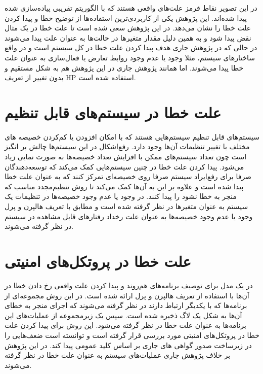 در این تصویر نقاط قرمز علت‌های واقعی هستند که با الگوریتم تقریبی پیاده‌سازی شده پیدا شده‌اند.
 این پژوهش یکی از کاربردی‌ترین استفاده‌ها از توضیح خطا و پیدا کردن علت خطا را نشان می‌دهد. 
در این پژوهش سعی شده است تا علت خطا در یک مثال نقض پیدا شود و به همین دلیل مقدار متغیر‌ها در حالت‌ها به عنوان علت پیدا می‌شوند در حالی که در پژوهش جاری هدف پیدا کردن علت خطا در کل سیستم است و در واقع ساختار‌های سیستم، مثلا وجود یا عدم وجود روابط تعارض یا فعال‌سازی به عنوان علت خطا پیدا می‌شوند.
اما همانند پژوهش جاری در این پژوهش هم به شکل مستقیم و بدون تغییر از تعریف 
HP
استفاده شده است.

\section{علت خطا در سیستم‌های قابل تنظیم}
سیستم‌های قابل تنظیم
سیستم‌هایی هستند که با امکان افزودن یا کم‌کردن خصیصه‌
های مختلف با تغییر تنظیمات
آن‌ها وجود دارد.
رفع‌اشکال در این سیستم‌ها چالش بر انگیز است چون تعداد سیستم‌های ممکن با افزایش تعداد خصیصه‌ها به صورت نمایی زیاد می‌شود.
پیدا کردن علت خطا در چنین سیستم‌هایی کمک می‌کند که توسعه‌دهندگان صرفا برای رفع‌ایراد سیستم صرفا روی خصیصه‌ای تمرکز کنند که به عنوان علت خطا پیدا شده است و علاوه بر این به آن‌ها کمک می‌کند تا روش تنظیم‌مجدد
مناسب که منجر به خطا نشود را پیدا کنند.
در 
\cite{assmann2021tactile}
وجود یا عدم وجود خصیصه‌ها در تنظیمات یک سیستم به عنوان متغیر‌ها در نظر گرفته شده‌ است و مطابق با تعریف هالپرن و پرل وجود یا عدم وجود خصیصه‌ها به عنوان علت رخداد رفتار‌های قابل مشاهده در سیستم در نظر گرفته می‌شوند.

\section{علت خطا در پروتکل‌های امنیتی}
در
\cite{actions-cause}
یک مدل برای توصیف برنامه‌های هم‌روند و پیدا کردن علت واقعی رخ دادن خطا در آن‌ها با استفاده از تعریف هالپرن و پرل ارائه شده است.
در این روش مجموعه‌ای از برنامه‌ها که با یکدیگر ارتباط دارند در نظر گرفته می‌شوند که اجرای منجر به خطای آن‌ها به شکل یک لاگ
ذخیره شده است.
سپس یک زیرمجموعه از عملیات‌های این برنامه‌ها به عنوان علت خطا در نظر گرفته می‌شود.
این روش برای پیدا کردن علت خطا در پروتکل‌های امنیتی مورد بررسی قرار گرفته است و توانسته است ضعف‌هایی را در زیرساخت صدور گواهی
های جاری بر اساس کلید عمومی
پیدا کند.
در این پژوهش بر خلاف پژوهش جاری عملیات‌های سیستم به عنوان علت خطا در نظر گرفته می‌شوند. 


